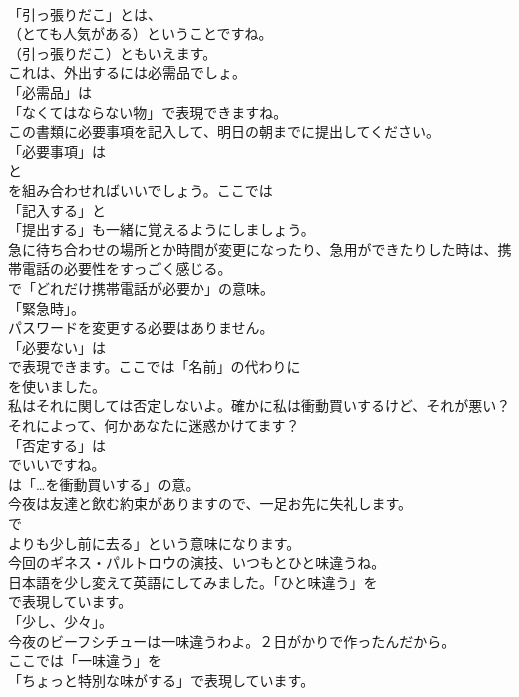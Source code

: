 \documentclass[8pt]{extreport}
\begin{document}
\begin{CJK}{UTF8}{min}
\\	「引っ張りだこ」とは、
\\	（とても人気がある）ということですね。
\\	（引っ張りだこ）ともいえます。	
\\	これは、外出するには必需品でしょ。 
\\	「必需品」は
\\	「なくてはならない物」で表現できますね。	
\\	この書類に必要事項を記入して、明日の朝までに提出してください。 
\\	「必要事項」は
\\	と
\\	を組み合わせればいいでしょう。ここでは
\\	「記入する」と
\\	「提出する」も一緒に覚えるようにしましょう。	
\\	急に待ち合わせの場所とか時間が変更になったり、急用ができたりした時は、携帯電話の必要性をすっごく感じる。 
\\	で「どれだけ携帯電話が必要か」の意味。
\\	「緊急時」。	
\\	パスワードを変更する必要はありません。 
\\	「必要ない」は
\\	で表現できます。ここでは「名前」の代わりに
\\	を使いました。	
\\	私はそれに関しては否定しないよ。確かに私は衝動買いするけど、それが悪い？それによって、何かあなたに迷惑かけてます？ 
\\	「否定する」は 
\\	でいいですね。
\\	は「…を衝動買いする」の意。	
\\	今夜は友達と飲む約束がありますので、一足お先に失礼します。 
\\	で
\\	よりも少し前に去る」という意味になります。	
\\	今回のギネス・パルトロウの演技、いつもとひと味違うね。 
\\	日本語を少し変えて英語にしてみました。「ひと味違う」を
\\	で表現しています。
\\	「少し、少々」。	
\\	今夜のビーフシチューは一味違うわよ。２日がかりで作ったんだから。 
\\	ここでは「一味違う」を
\\	「ちょっと特別な味がする」で表現しています。	

\end{CJK}
\end{document}
